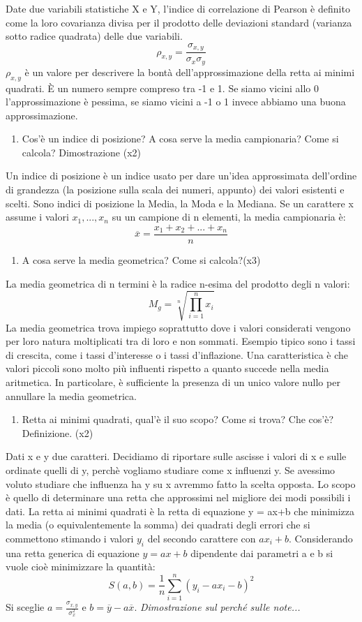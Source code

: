 Date due variabili statistiche X e Y, l'indice di correlazione di Pearson è definito come la loro covarianza divisa per il prodotto delle deviazioni standard (varianza sotto radice quadrata) delle due variabili.
\[\rho_{x,y} =\frac{\sigma_{x,y}}{\sigma_{x} \sigma_{y}}\]
$\rho_{x,y}$ è un valore per descrivere la bontà dell'approssimazione della retta ai minimi quadrati. È un numero sempre compreso tra -1 e 1. Se siamo vicini allo 0 l'approssimazione è pessima, se siamo vicini a -1 o 1 invece abbiamo una buona approssimazione.
 \begin{enumerate}[resume]\bfseries
\item Cos'è un indice di posizione? A cosa serve la media campionaria? Come si calcola? Dimostrazione (x2)
\end{enumerate}
Un indice di posizione è un indice usato per dare un'idea approssimata dell'ordine di grandezza (la posizione sulla scala dei numeri, appunto) dei valori esistenti e scelti.
Sono indici di posizione la Media, la Moda e la Mediana.
Se un carattere x assume i valori $x_1,...,x_n$ su un campione di n elementi, la media campionaria è:
\[\overline{x} = \frac{x_1+x_2+...+x_n}{n}\]
 \begin{enumerate}[resume]\bfseries
\item  A cosa serve la media geometrica? Come si calcola?(x3)
\end{enumerate}
La media geometrica di n termini è la radice n-esima del prodotto degli n valori:
\[
{\displaystyle M_{g}={\sqrt[{n}]{\prod _{i=1}^{n}x_{i}}}}
\]
La media geometrica trova impiego soprattutto dove i valori considerati vengono per loro natura moltiplicati tra di loro e non sommati. Esempio tipico sono i tassi di crescita, come i tassi d'interesse o i tassi d'inflazione.\newline
Una caratteristica è che valori piccoli sono molto più influenti rispetto a quanto succede nella media aritmetica. In particolare, è sufficiente la presenza di un unico valore nullo per annullare la media geometrica.
 \begin{enumerate}[resume]\bfseries
\item Retta ai minimi quadrati, qual'è il suo scopo? Come si trova? Che cos'è? Definizione. (x2)
\end{enumerate}
Dati x e y due caratteri. Decidiamo di riportare sulle ascisse i valori di x e sulle ordinate quelli di y, perchè vogliamo studiare come x influenzi y. Se avessimo voluto studiare che influenza ha y
su x avremmo fatto la scelta opposta.
Lo scopo è quello di determinare una retta che approssimi nel migliore dei modi possibili i dati.
La retta ai minimi quadrati è la retta di equazione y = ax+b che minimizza la media (o equivalentemente
la somma) dei quadrati degli errori che si commettono stimando i valori $y_i$ del secondo carattere con $ax_i +b$.
Considerando una retta generica di equazione $y = ax + b$ dipendente dai parametri a e b si vuole cioè
minimizzare la quantità:
\[ S(a, b) = \frac{1}{n} \sum_{i=1}^{n}
(y_i - ax_i - b)^2
\]
Si sceglie $a = \frac{\sigma_{x,y}}{\sigma_x^2}$ e $b = \overline{y} - a\overline{x}$.
\textit{Dimostrazione sul perché sulle note...}

